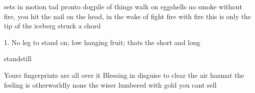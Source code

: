 \begin{center}
\end{center}

sets in motion
tad
pronto
dogpile of things
walk on eggshells
no smoke without fire, you hit the nail on the head, in the wake of
fight fire with fire
this is only the tip of the iceberg
struck a chord

1. No leg to stand on; low hanging fruit; thats the short and long

standstill

Youre fingerprints are all over it
Blessing in disguise
to clear the air
hazmat
the feeling is otherworldly
none the wiser
lumbered with gold you cant sell


